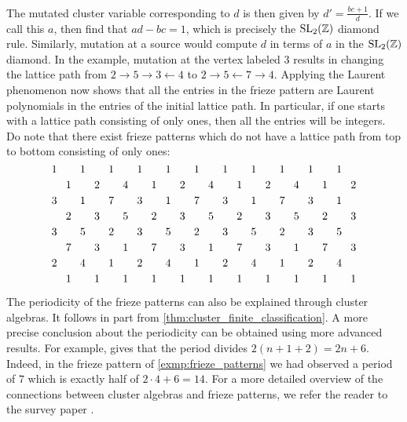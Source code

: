 \begin{example}
\begin{equation*}
\begin{tikzcd}
		\end{tikzcd}
	\end{equation*}
	The mutated cluster variable corresponding to $d$ is then given by $d' = \frac{bc +
			1}{d}$. If we call this $a$, then find that $ad - bc = 1$, which is precisely the
	$\operatorname{SL}_2(\mathbb{Z})$ diamond rule. Similarly, mutation at a source would compute $d$ in terms
	of $a$ in the $\operatorname{SL}_2(\mathbb{Z})$ diamond. In the example, mutation at the vertex labeled 3
	results in changing the lattice path from $2 \to 5 \to 3 \gets 4$ to $2 \to 5 \gets 7
		\to 4$. Applying the Laurent phenomenon now shows that all the entries in the frieze
	pattern are Laurent polynomials in the entries of the initial lattice path. In
	particular, if one starts with a lattice path consisting of only ones, then all the
	entries will be integers. Do note that there exist frieze patterns which do not have a
	lattice path from top to bottom consisting of only ones:
	\begin{equation*}
		\begin{tikzcd}[sep=0.2em,cramped]
			1&&1&&1&&1&&1&&1&&1&&1&&1&&1&&1\\
			&1&&2&&4&&1&&2&&4&&1&&2&&4&&1&&2\\
			3&&1&&7&&3&&1&&7&&3&&1&&7&&3&&1\\
			&2&&3&&5&&2&&3&&5&&2&&3&&5&&2&&3\\
			3&&5&&2&&3&&5&&2&&3&&5&&2&&3&&5\\
			&7&&3&&1&&7&&3&&1&&7&&3&&1&&7&&3\\
			2&&4&&1&&2&&4&&1&&2&&4&&1&&2&&4\\
			&1&&1&&1&&1&&1&&1&&1&&1&&1&&1&&1
		\end{tikzcd}
	\end{equation*}

	The periodicity of the frieze patterns can also be explained through cluster algebras.
	It follows in part from \cref{thm:cluster_finite_classification}. A more precise
	conclusion about the periodicity can be obtained using more advanced results. For
	example, \cite[Theorem 8.8]{FominZelevinsky2007CA4Coefficients} gives that the period
	divides $2(n + 1 + 2) = 2n +6$. Indeed, in the frieze pattern of
	\cref{exmp:frieze_patterns} we had observed a period of $7$ which is exactly half of
	$2\cdot 4 + 6 = 14$. For a more detailed overview of the connections between cluster
	algebras and frieze patterns, we refer the reader to the survey paper
	\cite{BaurFaberGratz2018ConwayCoxeterFriezes}.
\end{example}

